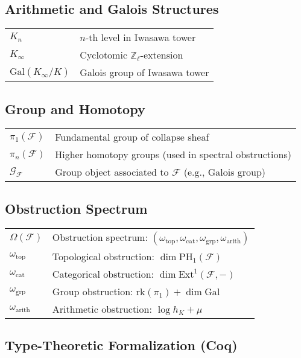 \documentclass[11pt]{article}
\begin{document}
\subsection*{Arithmetic and Galois Structures}

\begin{tabular}{ll}
$K_n$ & $n$-th level in Iwasawa tower \\
$K_\infty$ & Cyclotomic $\mathbb{Z}_\ell$-extension \\
$\mathrm{Gal}(K_\infty/K)$ & Galois group of Iwasawa tower \\
\end{tabular}

\subsection*{Group and Homotopy}

\begin{tabular}{ll}
$\pi_1(\mathcal{F})$ & Fundamental group of collapse sheaf \\
$\pi_n(\mathcal{F})$ & Higher homotopy groups (used in spectral obstructions) \\
$\mathcal{G}_{\mathcal{F}}$ & Group object associated to $\mathcal{F}$ (e.g., Galois group) \\
\end{tabular}

\subsection*{Obstruction Spectrum}

\begin{tabular}{ll}
$\Omega(\mathcal{F})$ & Obstruction spectrum: $(\omega_{\mathrm{top}}, \omega_{\mathrm{cat}}, \omega_{\mathrm{grp}}, \omega_{\mathrm{arith}})$ \\
$\omega_{\mathrm{top}}$ & Topological obstruction: $\dim \mathrm{PH}_1(\mathcal{F})$ \\
$\omega_{\mathrm{cat}}$ & Categorical obstruction: $\dim \mathrm{Ext}^1(\mathcal{F}, -)$ \\
$\omega_{\mathrm{grp}}$ & Group obstruction: $\mathrm{rk}(\pi_1) + \dim \mathrm{Gal}$ \\
$\omega_{\mathrm{arith}}$ & Arithmetic obstruction: $\log h_K + \mu$ \\
\end{tabular}

\subsection*{Type-Theoretic Formalization (Coq)}
\end{document}
